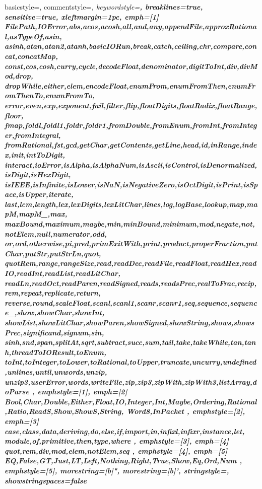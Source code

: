  {%
  basicstyle=\footnotesize\ttfamily,%
  commentstyle=\slshape\color{gray},%
  keywordstyle=\bfseries,%
  breaklines=true,
  sensitive=true,
  xleftmargin=1pc,
  emph={[1]
    FilePath,IOError,abs,acos,acosh,all,and,any,appendFile,approxRational,asTypeOf,asin,
    asinh,atan,atan2,atanh,basicIORun,break,catch,ceiling,chr,compare,concat,concatMap,
    const,cos,cosh,curry,cycle,decodeFloat,denominator,digitToInt,div,divMod,drop,
    dropWhile,either,elem,encodeFloat,enumFrom,enumFromThen,enumFromThenTo,enumFromTo,
    error,even,exp,exponent,fail,filter,flip,floatDigits,floatRadix,floatRange,floor,
    fmap,foldl,foldl1,foldr,foldr1,fromDouble,fromEnum,fromInt,fromInteger,fromIntegral,
    fromRational,fst,gcd,getChar,getContents,getLine,head,id,inRange,index,init,intToDigit,
    interact,ioError,isAlpha,isAlphaNum,isAscii,isControl,isDenormalized,isDigit,isHexDigit,
    isIEEE,isInfinite,isLower,isNaN,isNegativeZero,isOctDigit,isPrint,isSpace,isUpper,iterate,
    last,lcm,length,lex,lexDigits,lexLitChar,lines,log,logBase,lookup,map,mapM,mapM_,max,
    maxBound,maximum,maybe,min,minBound,minimum,mod,negate,not,notElem,null,numerator,odd,
    or,ord,otherwise,pi,pred,primExitWith,print,product,properFraction,putChar,putStr,putStrLn,quot,
    quotRem,range,rangeSize,read,readDec,readFile,readFloat,readHex,readIO,readInt,readList,readLitChar,
    readLn,readOct,readParen,readSigned,reads,readsPrec,realToFrac,recip,rem,repeat,replicate,return,
    reverse,round,scaleFloat,scanl,scanl1,scanr,scanr1,seq,sequence,sequence_,show,showChar,showInt,
    showList,showLitChar,showParen,showSigned,showString,shows,showsPrec,significand,signum,sin,
    sinh,snd,span,splitAt,sqrt,subtract,succ,sum,tail,take,takeWhile,tan,tanh,threadToIOResult,toEnum,
    toInt,toInteger,toLower,toRational,toUpper,truncate,uncurry,undefined,unlines,until,unwords,unzip,
    unzip3,userError,words,writeFile,zip,zip3,zipWith,zipWith3,listArray,doParse
  },%
  emphstyle={[1]\color{NU0}},%
  emph={[2]
    Bool,Char,Double,Either,Float,IO,Integer,Int,Maybe,Ordering,Rational,Ratio,ReadS,Show,ShowS,String,
    Word8,InPacket
  },%
  emphstyle={[2]\bfseries\color{KW4}},%
  emph={[3]
    case,class,data,deriving,do,else,if,import,in,infixl,infixr,instance,let,
    module,of,primitive,then,type,where
  },
  emphstyle={[3]\color{darkblue}},
  emph={[4]
    quot,rem,div,mod,elem,notElem,seq
  },
  emphstyle={[4]\color{NU0}\bfseries},
  emph={[5]
    EQ,False,GT,Just,LT,Left,Nothing,Right,True,Show,Eq,Ord,Num
  },
  emphstyle={[5]\color{KW4}\bfseries},
  morestring=[b]",%
  morestring=[b]',%
  stringstyle=\color{darkgreen},%
  showstringspaces=false
}
{}
{\smallskip}
\newcommand{\ihs}[1]{\lstset{language=fooHaskell,basicstyle=\color[gray]{0.6}}\lstinline|#1|}


